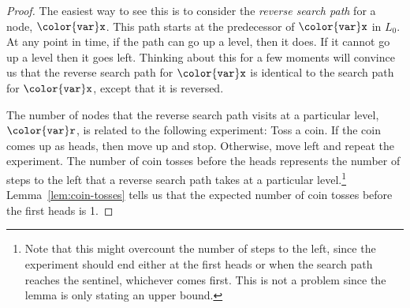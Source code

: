 \documentclass[10pt]{book}
\theoremstyle{plain}
\newcommand{\lemref}[1]{Lemma~\ref{lem:#1}}
\theoremstyle{definition}
\begin{document}
\begin{proof}
  The easiest way to see this is to consider the \emph{reverse search
  path} for a node, \ensuremath{\mathtt{{\color{var}x}}}.  This path starts at the predecessor of \ensuremath{\mathtt{{\color{var}x}}}
  in $L_0$.  At any point in time, if the path can go up a level, then
  it does.  If it cannot go up a level then it goes left.  Thinking about
  this for a few moments will convince us that the reverse search path for
  \ensuremath{\mathtt{{\color{var}x}}} is identical to the search path for \ensuremath{\mathtt{{\color{var}x}}}, except that it is reversed.

  The number of nodes that the reverse search path visits at a particular
  level, \ensuremath{\mathtt{{\color{var}r}}}, is related to the following experiment:  Toss a coin.
  If the coin comes up as heads, then move up and stop. Otherwise, move
  left and repeat the experiment.  The number of coin tosses before
  the heads represents the number of steps to the left that a reverse
  search path takes at a particular level.\footnote{Note that this
  might overcount the number of steps to the left, since the experiment
  should end either at the first heads or when the search path reaches
  the sentinel, whichever comes first. This is not a problem since the
  lemma is only stating an upper bound.} \lemref{coin-tosses} tells us
  that the expected number of coin tosses before the first heads is 1.


\end{proof}
\end{document}
